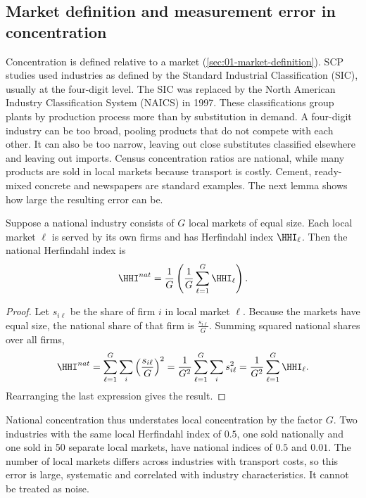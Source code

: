 \subsection{Market definition and measurement error in concentration}\label{sec:01-market-def-error}

Concentration is defined relative to a market (\cref{sec:01-market-definition}). SCP studies used
industries as defined by the Standard Industrial Classification (SIC), usually at the four-digit level.
The SIC was replaced by the North American Industry Classification System (NAICS) in 1997. These
classifications group plants by production process more than by substitution in demand. A four-digit
industry can be too broad, pooling products that do not compete with each other. It can also be too
narrow, leaving out close substitutes classified elsewhere and leaving out imports. Census concentration
ratios are national, while many products are sold in local markets because transport is costly. Cement,
ready-mixed concrete and newspapers are standard examples. The next lemma shows how large the resulting
error can be.

\begin{lemma}\label{prop:01-pooled-hhi}
Suppose a national industry consists of $G$ local markets of equal size. Each local market $\ell$ is
served by its own firms and has Herfindahl index $\HHI_\ell$. Then the national Herfindahl index is
\[
\HHI^{nat} = \frac{1}{G} \left( \frac{1}{G} \sum_{\ell = 1}^{G} \HHI_\ell \right).
\]
\end{lemma}

\begin{proof}
Let $s_{i\ell}$ be the share of firm $i$ in local market $\ell$. Because the markets have equal size, the
national share of that firm is $\frac{s_{i\ell}}{G}$. Summing squared national shares over all firms,
\[
\HHI^{nat} = \sum_{\ell = 1}^{G} \sum_{i} \left( \frac{s_{i\ell}}{G} \right)^2
 = \frac{1}{G^2} \sum_{\ell = 1}^{G} \sum_{i} s_{i\ell}^2
 = \frac{1}{G^2} \sum_{\ell = 1}^{G} \HHI_\ell .
\]
Rearranging the last expression gives the result.
\end{proof}

National concentration thus understates local concentration by the factor $G$. Two industries with the
same local Herfindahl index of $0.5$, one sold nationally and one sold in 50 separate local markets, have
national indices of $0.5$ and $0.01$. The number of local markets differs across industries with transport
costs, so this error is large, systematic and correlated with industry characteristics. It cannot be
treated as noise.

